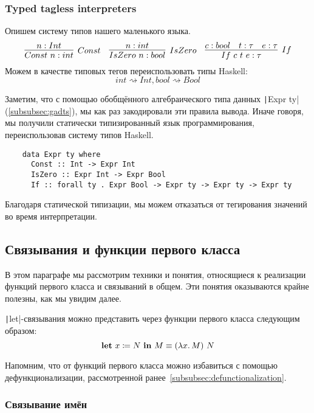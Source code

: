 \subsubsection{Typed tagless interpreters} \label{subsubsec:typed-tagless-initial}

Опишем систему типов нашего маленького языка.
\begin{equation*}{}
    \infer[Const]{Const~n : int}{n : Int}
    \quad
    \infer[IsZero]{IsZero~n : bool}{n : int}
    \quad
    \infer[If]{If~c~t~e : \tau}{c : bool & t : \tau & e : \tau}
\end{equation*}
Можем в качестве типовых тегов переиспользовать типы Haskell: \[int \rightsquigarrow Int, bool \rightsquigarrow Bool\]

Заметим, что с помощью обобщённого алгебраического типа данных \texttt|Expr ty| (\ref{subsubsec:gadts}), мы как раз закодировали эти правила вывода.
Иначе говоря, мы получили статически типизированный язык программирования, переиспользовав систему типов Haskell.
\begin{verbatim}
    data Expr ty where
      Const :: Int -> Expr Int
      IsZero :: Expr Int -> Expr Bool
      If :: forall ty . Expr Bool -> Expr ty -> Expr ty -> Expr ty
\end{verbatim}

Благодаря статической типизации, мы можем отказаться от тегирования значений во время интерпретации.

\subsection{Связывания и функции первого класса} \label{subsec:first-class-functions}

В этом параграфе мы рассмотрим техники и понятия, относящиеся к реализации функций первого класса и связываний в общем.
Эти понятия оказываются крайне полезны, как мы увидим далее.

\texttt|let|-связывания можно представить через функции первого класса следующим образом:
\[
    \mathbf{let} ~ x \coloneqq N ~ \mathbf{in} ~ M \equiv (\lambda x\ldotp M) ~ N
\]

Напомним, что от функций первого класса можно избавиться с помощью дефункционализации, рассмотренной ранее~\ref{subsubsec:defunctionalization}.

\subsubsection{Связывание имён}

